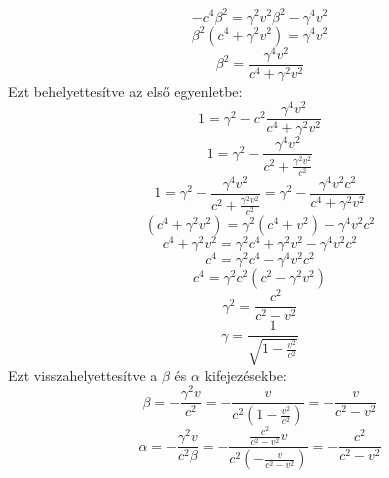 \documentclass[../main.tex]{subfiles}
\begin{document}
\begin{equation}
    -c^4 \beta^2 = \gamma^2 v^2 \beta^2 - \gamma^4 v^2
\end{equation}
\begin{equation}
    \beta^2 (c^4 + \gamma^2 v^2) = \gamma^4 v^2
\end{equation}
\begin{equation}
    \beta^2 = \frac{\gamma^4 v^2}{c^4 + \gamma^2 v^2}
\end{equation}
Ezt behelyettesítve az első egyenletbe:
\begin{equation}
    1 = \gamma^2 - c^2 \frac{\gamma^4 v^2}{c^4 + \gamma^2 v^2}
\end{equation}
\begin{equation}
    1 = \gamma^2 - \frac{\gamma^4 v^2}{c^2 + \frac{\gamma^2 v^2}{c^2}}
\end{equation}
\begin{equation}
    1 = \gamma^2 - \frac{\gamma^4 v^2}{c^2 + \frac{\gamma^2 v^2}{c^2}} = \gamma^2 - \frac{\gamma^4 v^2 c^2}{c^4 + \gamma^2 v^2}
\end{equation}
\begin{equation}
    (c^4 + \gamma^2 v^2) = \gamma^2 (c^4 + v^2) - \gamma^4 v^2 c^2
\end{equation}
\begin{equation}
    c^4 + \gamma^2 v^2 = \gamma^2 c^4 + \gamma^2 v^2 - \gamma^4 v^2 c^2
\end{equation}
\begin{equation}
    c^4 = \gamma^2 c^4 - \gamma^4 v^2 c^2
\end{equation}
\begin{equation}
    c^4 = \gamma^2 c^2 (c^2 - \gamma^2 v^2)
\end{equation}
\begin{equation}
    \gamma^2 = \frac{c^2}{c^2 - v^2}
\end{equation}
\begin{equation}
    \gamma = \frac{1}{\sqrt{1 - \frac{v^2}{c^2}}}
\end{equation}
Ezt visszahelyettesítve a $\beta$ és $\alpha$ kifejezésekbe:
\begin{equation}
    \beta = -\frac{\gamma^2 v}{c^2} = -\frac{v}{c^2 (1 - \frac{v^2}{c^2})} = -\frac{v}{c^2 - v^2}
\end{equation}
\begin{equation}
    \alpha = -\frac{\gamma^2 v}{c^2 \beta} = -\frac{\frac{c^2}{c^2 - v^2} v}{c^2 \left(-\frac{v}{c^2 - v^2}\right)} = -\frac{c^2}{c^2 - v^2}
\end{equation}
\end{document}
